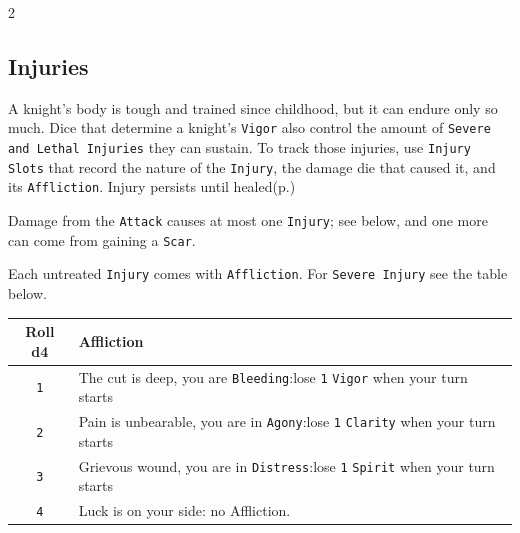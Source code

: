 \begin{multicols*}{2}
\newcolumn{}

\subsection*{Injuries}
\label{sec:injuries}

A knight's body is tough and trained since childhood, but it can endure only so much.
Dice that determine a knight's \texttt{Vigor} also control the amount of \texttt{Severe and Lethal Injuries} they can sustain.
To track those injuries, use \texttt{Injury Slots} that record the nature of the \texttt{Injury}, the damage die that caused it, and its \texttt{Affliction}.
Injury persists until healed(p.\pageref*{sec:healing})

Damage from the \texttt{Attack} causes at most one \texttt{Injury}; see below, and one more can come from gaining a \texttt{Scar}. 


Each untreated \texttt{Injury} comes with \texttt{Affliction}. For \texttt{Severe Injury} see the table below. 

\begin{center}
    \label{sec:affliction}
    \begin{tabular}{|c|p{6.4cm}|}
        \hline
        \textbf{Roll d4} & \textbf{Affliction} \\
        \hline
        \texttt{1} & The cut is deep, you are \texttt{Bleeding}:\newline lose \texttt{1} \texttt{Vigor} when your turn starts\\
        \texttt{2} & Pain is unbearable, you are in \texttt{Agony}:\newline lose \texttt{1} \texttt{Clarity} when your turn starts\\
        \texttt{3} & Grievous wound, you are in \texttt{Distress}:\newline lose \texttt{1} \texttt{Spirit} when your turn starts\\
        \texttt{4} & Luck is on your side: no Affliction.\\
        \hline
    \end{tabular}
\end{center}


\end{multicols*}
